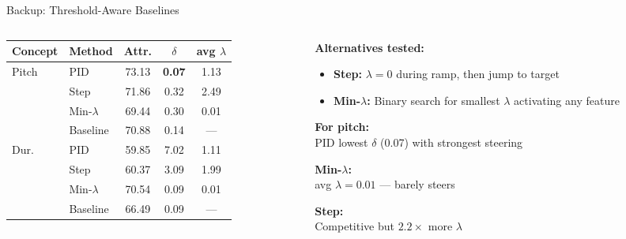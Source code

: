 \documentclass[aspectratio=169, 11pt]{beamer}
\begin{document}
\begin{frame}[noframenumbering]{Backup: Threshold-Aware Baselines}

\begin{columns}[T]
\begin{column}{0.55\textwidth}
\begin{table}
\centering\small
\begin{tabular}{llccc}
  \toprule
  Concept & Method & Attr. & $\delta$ & avg $\lambda$ \\
  \midrule
  \multirow{4}{*}{Pitch} & PID & 73.13 & \textbf{0.07} & 1.13 \\
  & Step & 71.86 & 0.32 & 2.49 \\
  & Min-$\lambda$ & 69.44 & 0.30 & 0.01 \\
  & Baseline & 70.88 & 0.14 & --- \\
  \midrule
  \multirow{4}{*}{Dur.} & PID & 59.85 & 7.02 & 1.11 \\
  & Step & 60.37 & 3.09 & 1.99 \\
  & Min-$\lambda$ & 70.54 & 0.09 & 0.01 \\
  & Baseline & 66.49 & 0.09 & --- \\
  \bottomrule
\end{tabular}
\end{table}
\end{column}

\begin{column}{0.42\textwidth}
\textbf{Alternatives tested:}
\begin{itemize}
  \item \textbf{Step:} $\lambda{=}0$ during ramp, then jump to target
  \item \textbf{Min-$\lambda$:} Binary search for smallest $\lambda$ activating any feature
\end{itemize}

\vspace{0.3em}
\textbf{For pitch:}\\
PID lowest $\delta$ (0.07) with strongest steering

\textbf{Min-$\lambda$:}\\
avg $\lambda{=}0.01$ --- barely steers

\textbf{Step:}\\
Competitive but $2.2\times$ more $\lambda$
\end{column}
\end{columns}
\end{frame}
\end{document}
